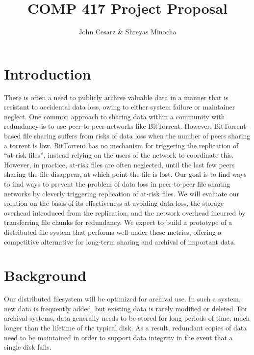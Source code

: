 \documentclass[twocolumn]{article}
\title{COMP 417 Project Proposal}
\author{John Cesarz \& Shreyas Minocha}
\begin{document}
\maketitle

\section{Introduction}

There is often a need to publicly archive valuable data in a manner that is resistant to accidental data loss, owing to either system failure or maintainer neglect.
%
One common approach to sharing data within a community with redundancy is to use peer-to-peer networks like BitTorrent.
However, BitTorrent-based file sharing suffers from risks of data loss when the number of peers sharing a torrent is low.
BitTorrent has no mechanism for triggering the replication of ``at-risk files'', instead relying on the users of the network to coordinate this.
However, in practice, at-risk files are often neglected, until the last few peers sharing the file disappear, at which point the file is lost.
%
Our goal is to find ways to find ways to prevent the problem of data loss in peer-to-peer file sharing networks by cleverly triggering replication of at-risk files.
%
%
%
We will evaluate our solution on the basis of its effectiveness at avoiding data loss, the storage overhead introduced from the replication, and the network overhead incurred by transferring file chunks for redundancy.
%
We expect to build a prototype of a distributed file system that performs well under these metrics, offering a competitive alternative for long-term sharing and archival of important data.

\section{Background}


Our distributed filesystem will be optimized for archival use.
In such a system, new data is frequently added, but existing data is rarely modified or deleted.
For archival systems, data generally needs to be stored for long periods of time, much longer than the lifetime of the typical disk.
As a result, redundant copies of data need to be maintained in order to support data integrity in the event that a single disk fails.
\end{document}
